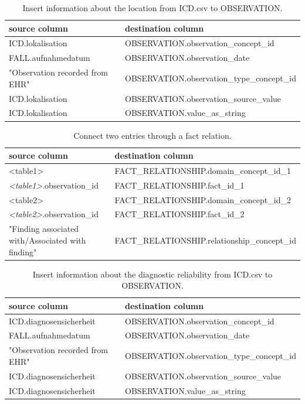 \begin{table} [htbp]
\begin{tabular}{|l|l|}
  \hline
  \textbf{source column} & \textbf{destination column} \\
  \hline
  ICD.lokalisation & OBSERVATION.observation\_concept\_id \\
  FALL.aufnahmedatum & OBSERVATION.observation\_date \\
  "Observation recorded from EHR" & OBSERVATION.observation\_type\_concept\_id \\
  ICD.lokalisation & OBSERVATION.observation\_source\_value \\
  ICD.lokalisation & OBSERVATION.value\_as\_string \\
  \hline
\end{tabular}
\caption{Insert information about the location from 
    ICD.csv to OBSERVATION.}
\label{etl-icd-location}
\end{table}

\begin{table} [htbp]
\begin{tabular}{|l|l|}
  \hline
  \textbf{source column} & \textbf{destination column} \\
  \hline
  \textless table1\textgreater & FACT\_RELATIONSHIP.domain\_concept\_id\_1 \\
  \textit{\textless table1\textgreater}.observation\_id & FACT\_RELATIONSHIP.fact\_id\_1 \\
  \textless table2\textgreater & FACT\_RELATIONSHIP.domain\_concept\_id\_2 \\
  \textit{\textless table2\textgreater}.observation\_id & FACT\_RELATIONSHIP.fact\_id\_2 \\
  "Finding associated with/Associated with finding" & FACT\_RELATIONSHIP.relationship\_concept\_id \\
  \hline
\end{tabular}
\caption{Connect two entries through a fact relation.}
\label{fact-relation}
\end{table}

\begin{table} [htbp]
\begin{tabular}{|l|l|}
  \hline
  \textbf{source column} & \textbf{destination column} \\
  \hline
  ICD.diagnosensicherheit & OBSERVATION.observation\_concept\_id \\
  FALL.aufnahmedatum & OBSERVATION.observation\_date \\
  "Observation recorded from EHR" & OBSERVATION.observation\_type\_concept\_id \\
  ICD.diagnosensicherheit & OBSERVATION.observation\_source\_value \\
  ICD.diagnosensicherheit & OBSERVATION.value\_as\_string \\
  \hline
\end{tabular}
\caption{Insert information about the diagnostic reliability from 
    ICD.csv to OBSERVATION.}
\label{etl-icd-diagnosensicherheit}
\end{table}

